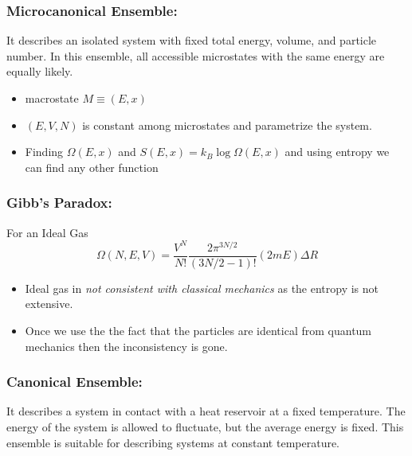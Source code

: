 \documentclass{article}
\begin{document}
\subsubsection{Microcanonical Ensemble:} It describes an isolated system with fixed total energy, volume, and particle number. In this ensemble, all accessible microstates with the same energy are equally likely.
\begin{itemize}
    \item macrostate $M \equiv (E, x)
$
    \item $(E,V,N)$ is constant among microstates and parametrize the system.
    \item Finding $\Omega(E, x)$ and $S(E, x) = k_B \log \Omega(E, x)
$ and using entropy we can find any other function

\end{itemize}
\subsubsection{Gibb's Paradox:} 
For an Ideal Gas
$$\Omega(N, E, V)
=\frac{{V^N}}{{N!}}\frac{{2\pi^{3N/2}}}{{(3N/2 - 1)!}}(2mE) \Delta R$$
\begin{itemize}
    \item Ideal gas in \textit{not consistent with classical mechanics} as the entropy is not extensive.

    \item Once we use the the fact that the particles are identical from quantum mechanics then the inconsistency is gone.
\end{itemize}

\subsubsection{Canonical Ensemble:} It describes a system in contact with a heat reservoir at a fixed temperature. The energy of the system is allowed to fluctuate, but the average energy is fixed. This ensemble is suitable for describing systems at constant temperature.
\end{document}
